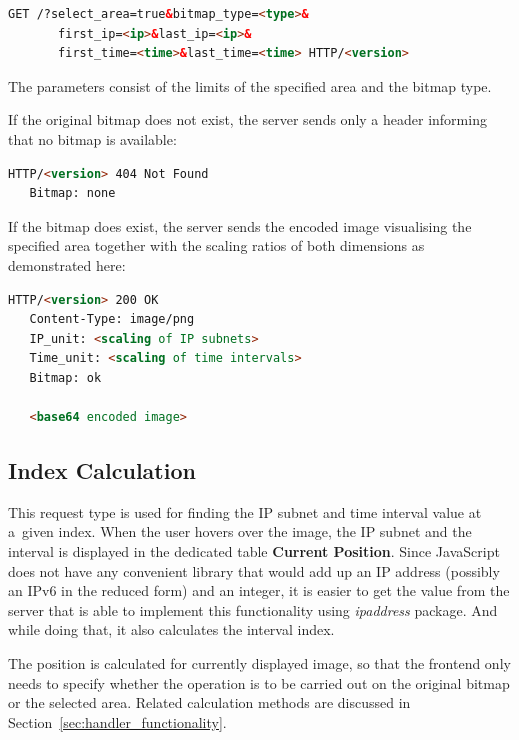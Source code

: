 \begin{lstlisting}[language=HTML,label={lst:select_area}]
   GET /?select_area=true&bitmap_type=<type>&
       first_ip=<ip>&last_ip=<ip>&
       first_time=<time>&last_time=<time> HTTP/<version>
\end{lstlisting}

The parameters consist of the limits of the specified area and the
bitmap type.

If the original bitmap does not exist, the server sends only a header
informing that no bitmap is available:

\begin{lstlisting}[language=HTML,label={lst:select_area_resp_none}]
   HTTP/<version> 404 Not Found
   Bitmap: none
\end{lstlisting}

If the bitmap does exist, the server sends the encoded image visualising the specified area
together with the scaling ratios of both dimensions as demonstrated here:

\begin{lstlisting}[language=HTML,label={lst:select_area_resp_ok}]
   HTTP/<version> 200 OK
   Content-Type: image/png
   IP_unit: <scaling of IP subnets>
   Time_unit: <scaling of time intervals>
   Bitmap: ok

   <base64 encoded image>
\end{lstlisting}

\subsection{Index Calculation}
This request type is used for finding the IP subnet and time interval value at a~given index.
When the user hovers over the image, the IP subnet and the interval is displayed in the dedicated table \textbf{Current Position}.
Since JavaScript does not have any convenient library that would add up an IP address (possibly an IPv6 in the reduced form)
and an integer, it is easier to get the value from the server that is able to implement this functionality using
\textit{ipaddress} package. And while doing that, it also calculates the interval index.

The position is calculated for currently displayed image, so that the frontend
only needs to specify whether the operation is to be
carried out on the original bitmap or the selected area.
Related calculation methods are discussed in Section~\ref{sec:handler_functionality}.

